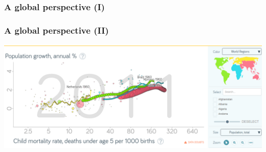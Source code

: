 \documentclass[
	12pt
	]{beamer}
\begin{document}
{%
\begin{frame}
\frametitle{A global perspective (I)}
\begingroup
\footnotesize %
	\begin{adjustbox}{max totalsize={\textwidth}{0.92\textheight}}
				
	\end{adjustbox}
\endgroup
\end{frame}
}


{%
\begin{frame}
\frametitle{A global perspective (II)}
	\includegraphics[width=1.1\textwidth, keepaspectratio]{figs/pop_mort.png}
\end{frame}
}
\end{document}
